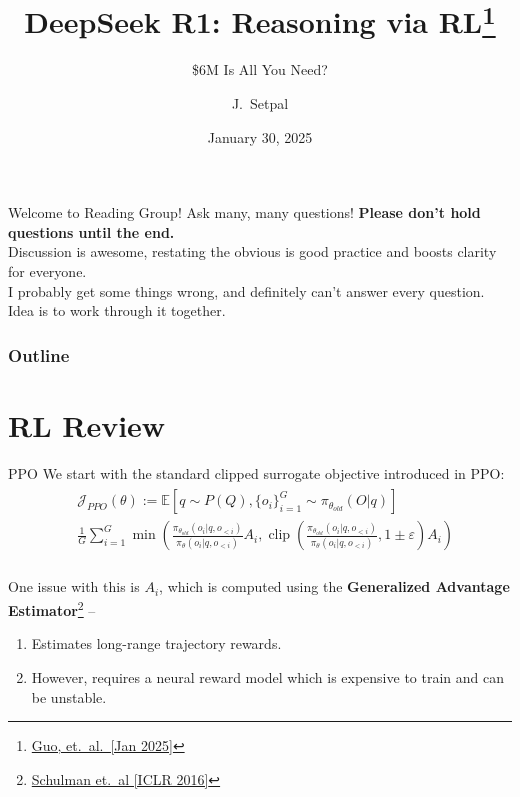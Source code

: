 \documentclass{beamer}
\title[DeepSeek R1]{DeepSeek R1: Reasoning via RL\thanks{\href{https://raw.githubusercontent.com/deepseek-ai/DeepSeek-R1/refs/heads/main/DeepSeek_R1.pdf}{Guo, et.~al.~[Jan 2025]}}}
\subtitle{\$6M Is All You Need?}
\author[Machine Learning @ Purdue] %
{J.~Setpal}
\date{January 30, 2025}
\DeclareMathOperator*{\clip}{clip}
\begin{document}
\frame{\titlepage}

\begin{frame}{Welcome to Reading Group!}
	Ask many, many questions! \textbf{Please don't hold questions until the end.} \pause \newline \\
	Discussion is awesome, restating the obvious is good practice and boosts clarity for everyone. \pause \newline \\
	I probably get some things wrong, and definitely can't answer every question. Idea is to work through it together.
\end{frame}


\begin{frame}
\frametitle{Outline}
\tableofcontents
\end{frame}

\section{RL Review}
{\let\oldfootnoterule\footnoterule
\def\footnoterule{\only<2->\oldfootnoterule}
\begin{frame}{PPO}
	We start with the standard clipped surrogate objective introduced in PPO:
	\begin{gather}
		\begin{split}
			&\mathcal{J}_{PPO}(\theta) := \mathbb{E}[q \sim P(Q), \{o_i\}^G_{i=1} \sim \pi_{\theta_{old}}(O | q)] \\
			&\frac{1}{G} \sum^G_{i=1} \min \left(\frac{\pi_{\theta_{old}}(o_i | q, o_{<i})}{\pi_\theta(o_i | q, o_{<i})} A_i, \clip \left( \frac{\pi_{\theta_{old}}(o_i | q, o_{<i})}{\pi_\theta(o_i | q, o_{<i})}, 1 \pm \varepsilon \right)  A_i \right) \\
		\end{split}
	\end{gather} \pause

	One issue with this is $A_i$, which is computed using the \textbf{Generalized Advantage Estimator}\footnote<2->{\href{https://arxiv.org/abs/1506.02438}{Schulman et.~al [ICLR 2016]}} --
	\begin{enumerate}[label=\arabic*.]
		\item Estimates long-range trajectory rewards. \pause \\
		\item However, requires a neural reward model which is expensive to train and can be unstable.
	\end{enumerate}
\end{frame}
}
\end{document}
